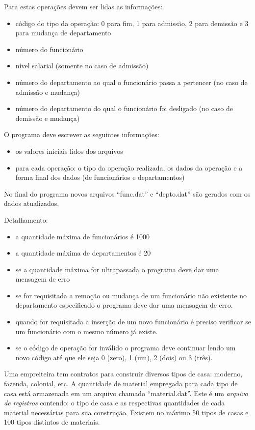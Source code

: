 Para estas operações devem ser lidas as informações:
\begin{itemize}
\item código do tipo da operação: 0 para fim, 1 para admissão, 2 para
  demissão e 3 para mudança de departamento
\item número do funcionário
\item nível salarial (somente no caso de admissão)
\item número do departamento ao qual o funcionário passa a pertencer (no
  caso de admissão e mudança)
\item número do departamento do qual o funcionário foi desligado (no caso
  de demissão e mudança)
\end{itemize}



O programa deve escrever as seguintes informações:
\begin{itemize}
\item os valores iniciais lidos dos arquivos
\item para cada operação: o tipo da operação realizada, os dados da
operação e a forma final dos dados (de funcionários e departamentos)
\end{itemize}

No final do programa novos arquivos ``func.dat'' e ``depto.dat'' são
gerados com os dados atualizados.

Detalhamento:
\begin{itemize}
\item a quantidade máxima de funcionários é 1000
\item a quantidade máxima de departamentos é 20
\item se a quantidade máxima for ultrapassada o programa deve dar uma
mensagem de erro
\item se for requisitada a remoção ou mudança de um funcionário não
  existente no departamento especificado o programa deve dar uma mensagem
  de erro.
\item quando for requisitada a inserção de um novo funcionário é preciso
  verificar se um funcionário com o mesmo número já existe.
\item se o código de operação for inválido o programa deve continuar lendo
um novo código até que ele seja 0 (zero), 1 (um), 2 (dois) ou 3 (três).
\end{itemize}


\item Uma empreiteira tem contratos para construir diversos tipos de casa: moderno,
fazenda, colonial, etc.   A quantidade de material empregada para cada
tipo de casa está armazenada em um arquivo chamado  ``material.dat''.
Este é um {\em arquivo de registros} contendo: o tipo de casa e as respectivas
quantidades de cada material necessárias para sua
construção. Existem no máximo 50 tipos de casas e 100 tipos distintos de
materiais. 

